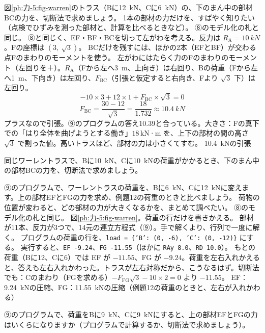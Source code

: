 \begin{phreidai}[ワーレントラスの下の部材を切断法で]
\label{ph:力-5:ex12}図\ref{ph:力-5:fig-warren}のトラス（Bに\qty{12}{kN}、Cに\qty{6}{kN}）の、下のまん中の部材BCの力を、切断法で求めましょう。
\phbamen
1本の部材の力だけを、すばやく知りたい（点検でひずみを測った部材と、計算を比べるときなど）。
\phmushi
⑧のモデル化の札と同じ。
\phzu
⑧と同じく、EF・BF・BCを切って左がわを考える。反力は $R_{\mathrm A}=\qty{10}{kN}$。Fの座標は $(3,\ \sqrt3)$。
\phriyu
BCだけを残すには、ほかの2本（EFとBF）が交わる点Fのまわりのモーメントを使う。
\phtateru
左がわにはたらく力のFのまわりのモーメント（左回りを＋）。$R_{\mathrm A}$（Fから左へ\qty{3}{m}、上向き）は右回り、Bの荷重（Fから左へ\qty{1}{m}、下向き）は左回り、$F_{\mathrm{BC}}$（引張と仮定すると右向き、Fより $\sqrt3$ 下）は左回り。
\[ -10\times3+12\times1+F_{\mathrm{BC}}\times\sqrt3=0 \]
\phtoku
\[ F_{\mathrm{BC}}=\frac{30-12}{\sqrt3}=\frac{18}{1.732}\approx\qty{10.4}{kN} \]
\phtashikame
プラスなので引張。⑨のプログラムの答え10.39と合っている。\quad 大きさ：Fの真下での「はり全体を曲げようとする働き」$18\,$kN·m を、上下の部材の間の高さ $\sqrt3$ で割った値。高いトラスほど、部材の力は小さくてすむ。
\kotae \qty{10.4}{kN}の引張
\end{phreidai}
\begin{jibun}
同じワーレントラスで、Bに\qty{10}{kN}、Cに\qty{10}{kN}の荷重がかかるとき、下のまん中の部材BCの力を、切断法で求めましょう。
\end{jibun}

\begin{phreidai}[ワーレントラスをプログラムで解く]
\label{ph:力-5:ex13}⑨のプログラムで、ワーレントラスの荷重を、Bに\qty{6}{kN}、Cに\qty{12}{kN}に変えます。上の部材EFとFGの力を求め、例題12の荷重のときと比べましょう。
\phbamen
荷物の位置が変わると、どの部材の力が大きくなるかを、まとめて調べたい。
\phmushi
⑧のモデル化の札と同じ。
\phzu
図\ref{ph:力-5:fig-warren}。荷重の行だけを書きかえる。
\phriyu
部材が11本、反力が3つで、14元の連立方程式（⑨）。手で解くより、行列で一度に解く。
\phtateru
プログラムの荷重の行を、\texttt{load = \{'B': (0, -6), 'C': (0, -12)\}} にする。
\phtoku
実行すると、\texttt{EF -9.24}、\texttt{FG -11.55}（ほかに \texttt{RAy 8.0}、\texttt{RD 10.0}）。
\phtashikame
もとの荷重（Bに12、Cに6）では EF が $-11.55$、FG が $-9.24$。荷重を左右入れかえると、答えも左右入れかわった。トラスが左右対称だから、こうなるはず。\quad 切断法でも：Cのまわり（FGを求める）$-F_{\mathrm{FG}}\sqrt3-10\times2=0$ より $-11.55$。
\kotae EF：\qty{9.24}{kN}の圧縮、FG：\qty{11.55}{kN}の圧縮（例題12の荷重のときと、左右が入れかわる）
\end{phreidai}
\begin{jibun}
⑨のプログラムで、荷重をBに\qty{9}{kN}、Cに\qty{9}{kN}にすると、上の部材EFとFGの力はいくらになりますか（プログラムで計算するか、切断法で求めましょう）。
\end{jibun}

